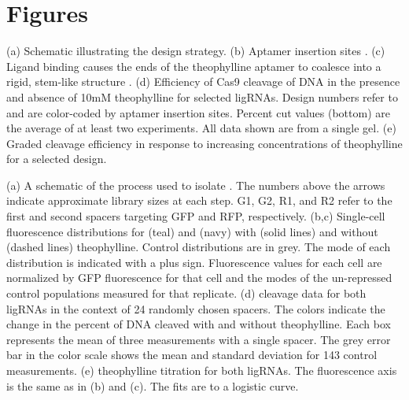 \documentclass[10pt,oneside]{article}
\begin{document}
% 
% 

\section{Figures}



 (a) Schematic illustrating the design strategy.
%
%
 (b) Aptamer insertion sites \autocite{briner2014}.
%
%
 (c) Ligand binding causes the ends of the theophylline aptamer to coalesce into a rigid, stem-like structure \autocite{zimmerman1997}.
%
%
 (d) Efficiency of \invitro{} Cas9 cleavage of DNA in the presence and absence of 10mM theophylline for selected ligRNAs.  Design numbers refer to  and are color-coded by aptamer insertion sites.  Percent cut values (bottom) are the average of at least two experiments.  All data shown are from a single gel.
%
%
 (e) Graded cleavage efficiency in response to increasing concentrations of theophylline for a selected design.



 (a) A schematic of the process used to isolate \ligrnaF{}.  The numbers above the arrows indicate approximate library sizes at each step.  G1, G2, R1, and R2 refer to the first and second spacers targeting GFP and RFP, respectively.
 (b,c) Single-cell fluorescence distributions for \ligrnaF{} (teal) and \ligrnaB{} (navy) with (solid lines) and without (dashed lines) theophylline.  Control distributions are in grey.  The mode of each distribution is indicated with a plus sign.  Fluorescence values for each cell are normalized by GFP fluorescence for that cell and the modes of the un-repressed control populations measured for that replicate.
 (d) \Invitro{} cleavage data for both ligRNAs in the context of 24 randomly chosen spacers.  The colors indicate the change in the percent of DNA cleaved with and without theophylline.  Each box represents the mean of three measurements with a single spacer.   The grey error bar in the color scale shows the mean and standard deviation for 143 control measurements.
 (e) \Invivo{} theophylline titration for both ligRNAs.  The fluorescence axis is the same as in (b) and (c).  The fits are to a logistic curve.
 
\end{document}

